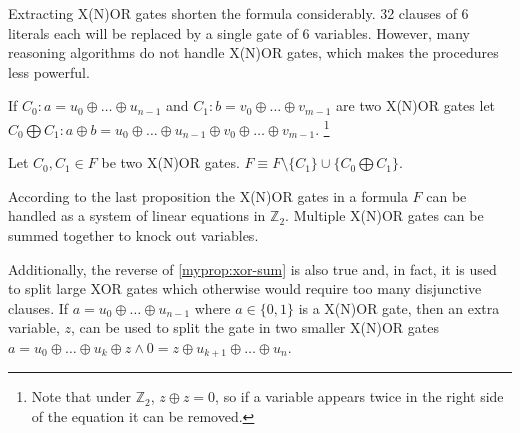 Extracting X(N)OR gates shorten the formula considerably. 32
clauses of 6 literals each will be replaced by a single gate of 6
variables. However, many reasoning algorithms do not handle X(N)OR
gates, which makes the procedures less powerful.

\begin{table}
  \centering

  \caption{Example of CNF encodings of XOR and XNOR gates}
  \label{tbl:xor-encoding}
\end{table}


\begin{mydef}
  \label{myprop:xor-sum}
  If $C_0: a = u_0 \oplus \ldots \oplus u_{n-1}$ and $C_1: b =
  v_0 \oplus \ldots \oplus v_{m-1}$ are two X(N)OR gates let $C_0
  \bigoplus C_1: a \oplus b = u_0 \oplus \ldots \oplus u_{n-1}
  \oplus v_0 \oplus \ldots \oplus v_{m-1}$. \footnote{Note that
  under $\mathbb{Z}_2$, $z \oplus z = 0$, so if a variable appears
  twice in the right side of the equation it can be removed.}
\end{mydef}

\begin{myprop}
  Let $C_0, C_1 \in F$ be two X(N)OR gates. $F \equiv F \setminus \{C_1\} \cup
  \{C_0 \bigoplus C_1\}$.
\end{myprop}

According to the last proposition the X(N)OR gates in a
formula $F$ can be handled as a system of linear equations in
$\mathbb{Z}_2$. Multiple X(N)OR gates can be summed together to
knock out variables.

Additionally, the reverse of \ref{myprop:xor-sum} is also true and,
in fact, it is used to split large XOR gates which otherwise would
require too many disjunctive clauses. If $a = u_0 \oplus \ldots
\oplus u_{n-1}$ where $a \in \{0, 1\}$ is a X(N)OR gate, then an
extra variable, $z$, can be used to split the gate in two smaller
X(N)OR gates $a = u_0 \oplus \ldots \oplus u_{k} \oplus z \land 0 =
z \oplus u_{k + 1} \oplus \ldots \oplus u_{n}$.


